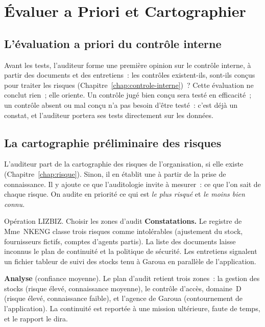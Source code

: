 \section{Évaluer a Priori et Cartographier}
\label{sec:c06-risques}

\subsection{L'évaluation a priori du contrôle interne}

Avant les tests, l'auditeur forme une première opinion sur le contrôle
interne, à partir des documents et des entretiens~: les contrôles
existent-ils, sont-ils conçus pour traiter les risques
(Chapitre~\ref{chap:controle-interne})~? Cette évaluation ne conclut rien~;
elle oriente. Un contrôle jugé bien conçu sera testé en efficacité~; un
contrôle absent ou mal conçu n'a pas besoin d'être testé~: c'est déjà un
constat, et l'auditeur portera ses tests directement sur les données.

\subsection{La cartographie préliminaire des risques}

L'auditeur part de la cartographie des risques de l'organisation, si elle
existe (Chapitre~\ref{chap:risque}). Sinon, il en établit une à partir de
la prise de connaissance. Il y ajoute ce que l'auditologie invite à
mesurer~: ce que l'on sait de chaque risque. On audite en priorité ce qui
est \emph{le plus risqué} et \emph{le moins bien connu}.

\begin{boxscenario}{Opération LIZBIZ. Choisir les zones d'audit}
\textbf{Constatations.} Le registre de Mme~NKENG classe trois risques comme
intolérables (ajustement du stock, fournisseurs fictifs, comptes d'agents
partis). La liste des documents laisse inconnus le plan de continuité et la
politique de sécurité. Les entretiens signalent un fichier tableur de suivi
des stocks tenu à Garoua en parallèle de l'application.

\medskip
\textbf{Analyse} (confiance moyenne). Le plan d'audit retient trois zones~:
la gestion des stocks (risque élevé, connaissance moyenne), le contrôle
d'accès, domaine~D (risque élevé, connaissance faible), et l'agence de
Garoua (contournement de l'application). La continuité est reportée à une
mission ultérieure, faute de temps, et le rapport le dira.
\end{boxscenario}

